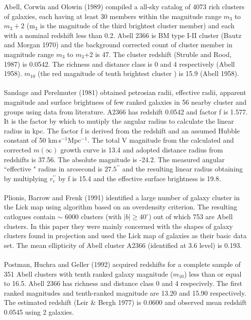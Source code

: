 Abell, Corwin and Olowin (1989) compiled a all-sky catalog of 4073 rich clusters of galaxies, each having at least 30 members within the magnitude range $m_3$ to $m_3+2$ (m$_3$ is the magnitude of the third brightest cluster member) and each with a nominal redshift less than 0.2. Abell 2366 is BM type I-II cluster (Bautz and Morgan 1970) and the background corrected count of cluster member in magnitude range $m_3$ to $m_3$+2 is 47. The cluster redshift (Struble and Rood, 1987) is 0.0542. The richness and distance class is 0 and 4 respectively (Abell 1958). $m_{10}$ (the red magnitude of tenth brightest cluster ) is 15.9 (Abell 1958).\\\\
Sandage and Perelmuter (1981) obtained petrosian radii, effective radii, apparent magnitude and surface brightness of few ranked galaxies in 56 nearby cluster and groups using data from literature. A2366 has redshift 0.0542 and factor f is 1.577. It is  the factor by which to mutiply the angular radius to calculate the linear radius in kpc. The factor f is derived from the redshift and an assumed Hubble constant of 50 km\,s$^{-1}$Mpc$^{-1}$. The total V magnitude from the calculated and corrected $m(\infty)$ growth curve is 13.4 and adopted distance radius from redshifts is 37.56. The absolute magnitude is -24.2. The measured angular ``effective " radius in arcsecond is $27.5^{\prime\prime}$ and the resulting linear radius obtaining by multiplying $r_e^{\prime\prime}$ by f is 15.4 and the effective surface brightness is  19.8.\\\\
Plionis, Barrow and Frenk (1991) identified a large number of galaxy cluster in the Lick map using algorithm based on an overdensity criterion. The resulting catlogues contain $\sim$ 6000 clusters (with $|b|\geq40^\circ$) out of which 753 are Abell clusters. In this paper they were mainly concerned with the shapes of galaxy clusters found in projection and used the Lick map of galaxies as their basic data set. The  mean ellipticity of Abell cluster A2366 (identified at 3.6 level) is 0.193.\\\\
Postman, Huchra and Geller (1992) acquired redshifts for a complete sample of 351 Abell clusters with tenth ranked galaxy magnitude ($m_{10}$) less than or equal to 16.5. Abell 2366 has richness and distance class 0 and  4 respecively. The first ranked magnitudes and tenth-ranked magnitude are 13.20 and 15.90 respectively. The estimated redshift (Leir \& Bergh 1977) is 0.0600 and observed mean redshift 0.0545 using 2 galaxies.\\\\
